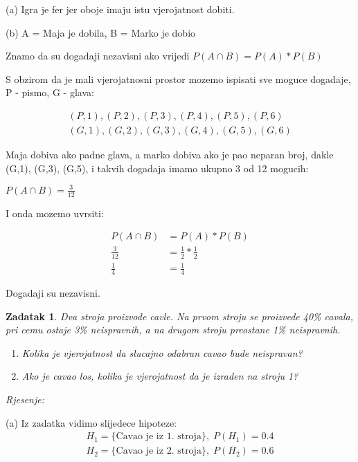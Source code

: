 \documentclass{report}
\newcommand{\rjesenje}{\begin{flushleft}\it Rjesenje:\end{flushleft}}
\newcommand{\onespace}{\vspace{1pc}}
\theoremstyle{plain}
\newtheorem{thm}{Zadatak}[chapter] %
\begin{document}
(a) Igra je fer jer oboje imaju istu vjerojatnost dobiti.

\onespace

(b) A = Maja je dobila, B = Marko je dobio

\onespace

Znamo da su dogadaji nezavisni ako vrijedi $P(A\cap B) = P(A) * P(B)$

\onespace

S obzirom da je mali vjerojatnosni prostor mozemo ispisati sve moguce dogadaje, P - pismo, G - glava:

\begin{align*}
    (P,1), (P,2), (P,3), (P,4), (P,5), (P,6) \\
    (G,1), (G,2), (G,3), (G,4), (G,5), (G,6)
\end{align*}

Maja dobiva ako padne glava, a marko dobiva ako je pao neparan broj,
dakle (G,1), (G,3), (G,5), i takvih dogadaja imamo ukupno 3 od 12 mogucih:

\onespace
 
$P(A\cap B) = \frac{3}{12}$

\onespace

I onda mozemo uvrsiti:

\begin{align*}
        P(A\cap B) &= P(A) * P(B) \\
      \frac{3}{12} &= \frac{1}{2} * \frac{1}{2} \\
       \frac{1}{4} &= \frac{1}{4} 
\end{align*}

Dogadaji su nezavisni.


\onespace
\begin{thm}Dva stroja proizvode cavle. Na prvom stroju se proizvede 40\% cavala, 
    pri cemu ostaje 3\% neispravnih, a na drugom stroju preostane 1\% neispravnih.
    \begin{enumerate}[label=(\alph*)]
        \item Kolika je vjerojatnost da slucajno odabran cavao bude neispravan?
        \item Ako je cavao los, kolika je vjerojatnost da je izraden na stroju 1?
    \end{enumerate}
\end{thm}
\rjesenje 
(a) Iz zadatka vidimo slijedece hipoteze:
\begin{align*}
    H_1 = \{ \text{Cavao je iz 1. stroja}\}, \; P(H_1) = 0.4 \\
    H_2 = \{ \text{Cavao je iz 2. stroja}\}, \; P(H_2) = 0.6
\end{align*}
\end{document}
